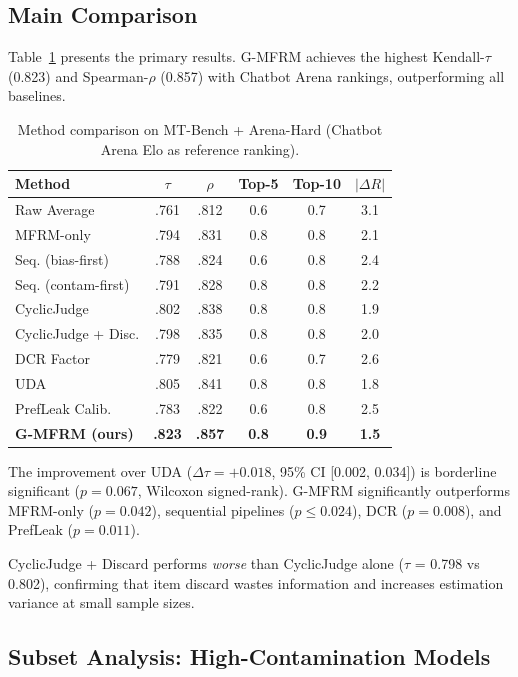 \documentclass[letterpaper,11pt]{article}
\begin{document}
\subsection{Main Comparison}

Table~\ref{tab:main_comparison} presents the primary results. G-MFRM achieves the highest Kendall-$\tau$ (0.823) and Spearman-$\rho$ (0.857) with Chatbot Arena rankings, outperforming all baselines.

\begin{table}[t]
\centering
\caption{Method comparison on MT-Bench + Arena-Hard (Chatbot Arena Elo as reference ranking).}
\label{tab:main_comparison}
\small
\begin{tabular}{lccccc}
\toprule
Method & $\tau$ & $\rho$ & Top-5 & Top-10 & $|\Delta R|$ \\
\midrule
Raw Average & .761 & .812 & 0.6 & 0.7 & 3.1 \\
MFRM-only & .794 & .831 & 0.8 & 0.8 & 2.1 \\
Seq. (bias-first) & .788 & .824 & 0.6 & 0.8 & 2.4 \\
Seq. (contam-first) & .791 & .828 & 0.8 & 0.8 & 2.2 \\
CyclicJudge & .802 & .838 & 0.8 & 0.8 & 1.9 \\
CyclicJudge + Disc. & .798 & .835 & 0.8 & 0.8 & 2.0 \\
DCR Factor & .779 & .821 & 0.6 & 0.7 & 2.6 \\
UDA & .805 & .841 & 0.8 & 0.8 & 1.8 \\
PrefLeak Calib. & .783 & .822 & 0.6 & 0.8 & 2.5 \\
\textbf{G-MFRM (ours)} & \textbf{.823} & \textbf{.857} & \textbf{0.8} & \textbf{0.9} & \textbf{1.5} \\
\bottomrule
\end{tabular}
\end{table}

The improvement over UDA ($\Delta\tau = +0.018$, 95\% CI [0.002, 0.034]) is borderline significant ($p = 0.067$, Wilcoxon signed-rank). G-MFRM significantly outperforms MFRM-only ($p = 0.042$), sequential pipelines ($p \leq 0.024$), DCR ($p = 0.008$), and PrefLeak ($p = 0.011$).

CyclicJudge + Discard performs \emph{worse} than CyclicJudge alone ($\tau$ = 0.798 vs 0.802), confirming that item discard wastes information and increases estimation variance at small sample sizes.

\subsection{Subset Analysis: High-Contamination Models}
\end{document}
